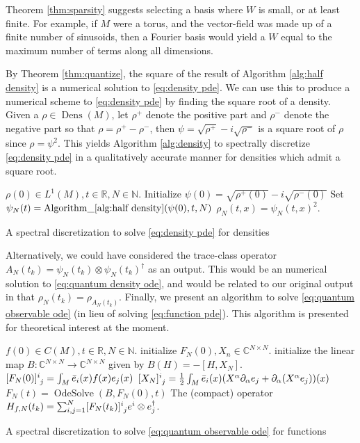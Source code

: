 \documentclass[final,leqno]{siamart}
\DeclareMathOperator{\Dens}{Dens}
\DeclareMathOperator{\OdeSolve}{OdeSolve}
\begin{document}
Theorem \ref{thm:sparsity} suggests selecting a basis where $W$ is small, or at least finite.
For example, if $M$ were a torus, and the vector-field was made up of a finite number of sinusoids, then a Fourier basis would yield a $W$ equal to the maximum number of terms along all dimensions.

By Theorem \ref{thm:quantize}, the square of the result of Algorithm \ref{alg:half density} is a numerical solution to \eqref{eq:density pde}.
We can use this to produce a numerical scheme to \eqref{eq:density pde} by finding the square root of a density.
Given a $\rho \in \Dens(M)$, let $\rho^{+}$ denote the positive part and $\rho^{-}$ denote the negative part so that $\rho = \rho^{+} - \rho^{-}$, 
then $\psi = \sqrt{\rho^{+}} - i \sqrt{\rho^{-}}$ is a square root of $\rho$ since $\rho = \psi^{2}$.
This yields Algorithm \ref{alg:density} to spectrally discretize \eqref{eq:density pde} in a qualitatively accurate manner for densities which admit a square root.

\begin{algorithm}
\begin{algorithmic}
	\REQUIRE $\rho(0) \in L^{1}(M), t \in \mathbb{R},N \in \mathbb{N}$.
	\STATE	Initialize $\psi(0) =  \sqrt{\rho^{+}(0)} - i \sqrt{\rho^{-}(0)}$
	\STATE	Set $\psi_{N}(t) =  \operatorname{ Algorithm\_ \ref{alg:half density} }( \psi(0) , t, N )$
	\RETURN $\rho_{N}(t , x) = \psi_{N}(t , x)^{2}$.
\end{algorithmic}
	\caption{A spectral discretization to solve \eqref{eq:density pde} for densities} \label{alg:density}
\end{algorithm}

Alternatively, we could have considered the trace-class operator $A_{N}(t_{k}) = \psi_{N}(t_{k}) \otimes \psi_{N}(t_{k})^{\dagger}$ as an output. 
This would be an numerical solution to \eqref{eq:quantum density ode}, and would be related to our original output in that $\rho_{N}(t_{k}) = \rho_{A_{N}(t_{k})}$.
Finally, we present an algorithm to solve \eqref{eq:quantum observable ode} (in lieu of solving \eqref{eq:function pde}).
This algorithm is presented for theoretical interest at the moment.

\begin{algorithm}[H]
\begin{algorithmic}
	\REQUIRE $f(0) \in C(M), t \in \mathbb{R}, N \in \mathbb{N}$.
	\STATE initialize $F_{N}(0), X_{n} \in \mathbb{C}^{N \times N}$.
	\STATE initialize the linear map $B: \mathbb{C}^{N \times N} \to \mathbb{C}^{N \times N}$ given by $B(H) = - [H , X_{N}]$.
		\STATE $[F_{N}(0)]\indices{^i_{j}} =  \int_{M} \bar{e}_{i}(x) f(x) e_{j}(x)$ 
		\STATE $[X_{N}]\indices{^i_{j}} = \frac{1}{2} \int_{M} \bar{e}_{i}(x) ( X^{\alpha} \partial_{\alpha} e_{j} + \partial_{\alpha}( X^{\alpha} e_{j}) )(x)$ 
	\ENDFOR
	\STATE $F_{N}(t) = \OdeSolve( B , F_{N}(0) , t)$
	\RETURN The (compact) operator $H_{f,N}(t_{k}) = \sum_{i,j=1}^{N}[ F_{N}(t_{k}) ] \indices{^{i}_{j}} e^{i} \otimes e_{j}^{\dagger}$.
\end{algorithmic}
	\caption{A spectral discretization to solve \eqref{eq:quantum observable ode} for functions} \label{alg:function}
\end{algorithm}
\end{document}
